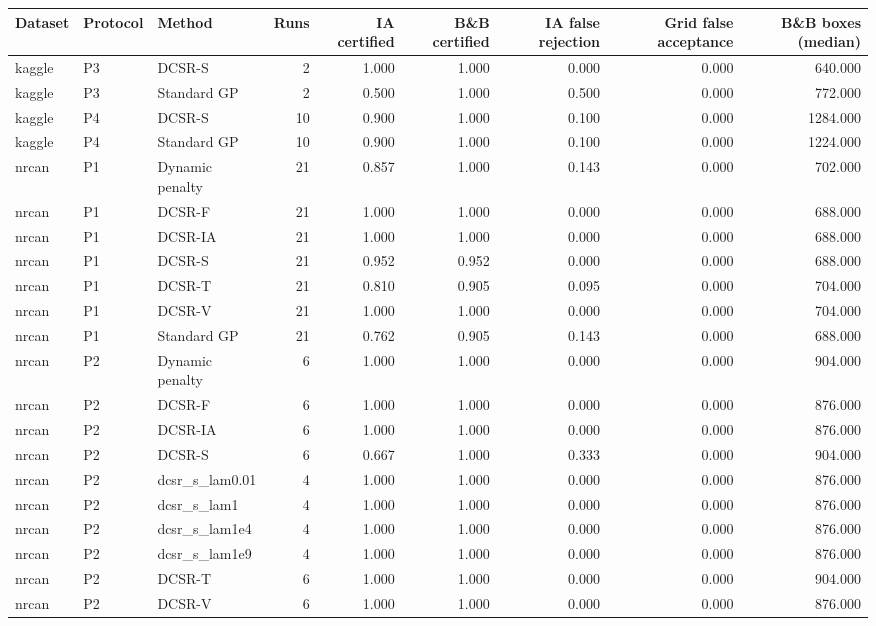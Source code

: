 \begin{tabular}{lllrrrrrr}
\toprule
Dataset & Protocol & Method & Runs & IA certified & B\&B certified & IA false rejection & Grid false acceptance & B\&B boxes (median) \\
\midrule
kaggle & P3 & DCSR-S & 2 & 1.000 & 1.000 & 0.000 & 0.000 & 640.000 \\
kaggle & P3 & Standard GP & 2 & 0.500 & 1.000 & 0.500 & 0.000 & 772.000 \\
kaggle & P4 & DCSR-S & 10 & 0.900 & 1.000 & 0.100 & 0.000 & 1284.000 \\
kaggle & P4 & Standard GP & 10 & 0.900 & 1.000 & 0.100 & 0.000 & 1224.000 \\
nrcan & P1 & Dynamic penalty & 21 & 0.857 & 1.000 & 0.143 & 0.000 & 702.000 \\
nrcan & P1 & DCSR-F & 21 & 1.000 & 1.000 & 0.000 & 0.000 & 688.000 \\
nrcan & P1 & DCSR-IA & 21 & 1.000 & 1.000 & 0.000 & 0.000 & 688.000 \\
nrcan & P1 & DCSR-S & 21 & 0.952 & 0.952 & 0.000 & 0.000 & 688.000 \\
nrcan & P1 & DCSR-T & 21 & 0.810 & 0.905 & 0.095 & 0.000 & 704.000 \\
nrcan & P1 & DCSR-V & 21 & 1.000 & 1.000 & 0.000 & 0.000 & 704.000 \\
nrcan & P1 & Standard GP & 21 & 0.762 & 0.905 & 0.143 & 0.000 & 688.000 \\
nrcan & P2 & Dynamic penalty & 6 & 1.000 & 1.000 & 0.000 & 0.000 & 904.000 \\
nrcan & P2 & DCSR-F & 6 & 1.000 & 1.000 & 0.000 & 0.000 & 876.000 \\
nrcan & P2 & DCSR-IA & 6 & 1.000 & 1.000 & 0.000 & 0.000 & 876.000 \\
nrcan & P2 & DCSR-S & 6 & 0.667 & 1.000 & 0.333 & 0.000 & 904.000 \\
nrcan & P2 & dcsr\_s\_lam0.01 & 4 & 1.000 & 1.000 & 0.000 & 0.000 & 876.000 \\
nrcan & P2 & dcsr\_s\_lam1 & 4 & 1.000 & 1.000 & 0.000 & 0.000 & 876.000 \\
nrcan & P2 & dcsr\_s\_lam1e4 & 4 & 1.000 & 1.000 & 0.000 & 0.000 & 876.000 \\
nrcan & P2 & dcsr\_s\_lam1e9 & 4 & 1.000 & 1.000 & 0.000 & 0.000 & 876.000 \\
nrcan & P2 & DCSR-T & 6 & 1.000 & 1.000 & 0.000 & 0.000 & 904.000 \\
nrcan & P2 & DCSR-V & 6 & 1.000 & 1.000 & 0.000 & 0.000 & 876.000 \\

\end{tabular}

